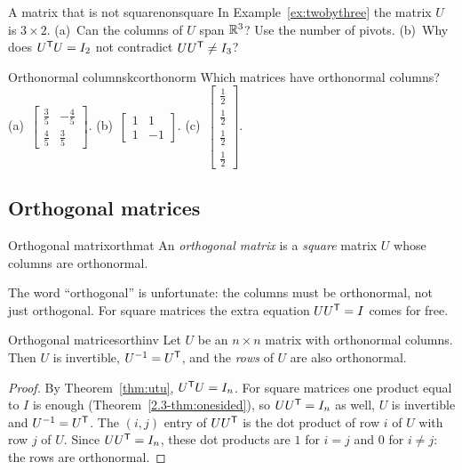 \documentclass[11pt]{article}
\begin{document}
\begin{think}{A matrix that is not square}{nonsquare}
In Example~\ref{ex:twobythree} the matrix $U$ is $3\times2$. (a)~Can the columns of $U$ span $\mathbb{R}^3$? Use the number of pivots. (b)~Why does $U^{\mathsf T} U=I_2$ not contradict $UU^{\mathsf T}\neq I_3$?
\end{think}

\begin{kc}{Orthonormal columns}{kcorthonorm}
Which matrices have orthonormal columns? (a)~$\begin{bmatrix}\tfrac35&-\tfrac45\\\tfrac45&\tfrac35\end{bmatrix}$. (b)~$\begin{bmatrix}1&1\\1&-1\end{bmatrix}$. (c)~$\begin{bmatrix}\tfrac12\\\tfrac12\\\tfrac12\\\tfrac12\end{bmatrix}$.
\end{kc}

\subsection*{Orthogonal matrices}

\begin{defn}{Orthogonal matrix}{orthmat}
An \emph{orthogonal matrix} is a \emph{square} matrix $U$ whose columns are orthonormal.
\end{defn}

The word ``orthogonal'' is unfortunate: the columns must be orthonormal, not just orthogonal. For square matrices the extra equation $UU^{\mathsf T}=I$ comes for free.

\begin{thm}{Orthogonal matrices}{orthinv}
Let $U$ be an $n\times n$ matrix with orthonormal columns. Then $U$ is invertible, $U^{-1}=U^{\mathsf T}$, and the \emph{rows} of $U$ are also orthonormal.
\end{thm}

\begin{proof}
By Theorem~\ref{thm:utu}, $U^{\mathsf T} U=I_n$. For square matrices one product equal to $I$ is enough (Theorem~\ref{2.3-thm:onesided}), so $UU^{\mathsf T}=I_n$ as well, $U$ is invertible and $U^{-1}=U^{\mathsf T}$. The $(i,j)$ entry of $UU^{\mathsf T}$ is the dot product of row $i$ of $U$ with row $j$ of $U$. Since $UU^{\mathsf T}=I_n$, these dot products are $1$ for $i=j$ and $0$ for $i\neq j$: the rows are orthonormal.
\end{proof}
\end{document}
